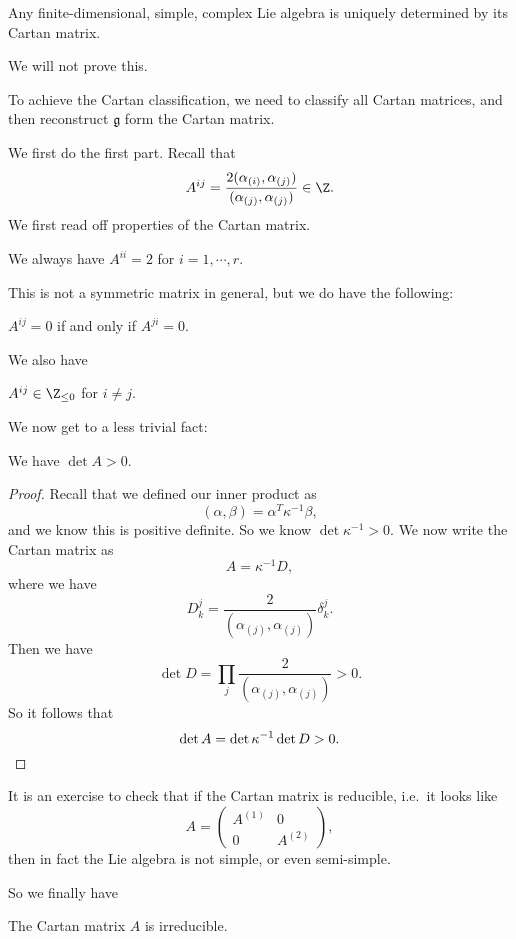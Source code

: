 \documentclass[a4paper]{article}
\begin{document}
\begin{thm}[Cartan]
  Any finite-dimensional, simple, complex Lie algebra is uniquely determined by its Cartan matrix.
\end{thm}

We will not prove this.

To achieve the Cartan classification, we need to classify all Cartan matrices, and then reconstruct $\mathfrak{g}$ form the Cartan matrix.

We first do the first part. Recall that
\[
  A^{ij} = \frac{2 (\alpha_{(i)}, \alpha_{(j)})}{(\alpha_{(j)}, \alpha_{(j)})} \in \Z.
\]
We first read off properties of the Cartan matrix.
\begin{prop}
  We always have $A^{ii} = 2$ for $i = 1, \cdots, r$.
\end{prop}

This is not a symmetric matrix in general, but we do have the following:
\begin{prop}
  $A^{ij} = 0$ if and only if $A^{ji} = 0$.
\end{prop}

We also have
\begin{prop}
  $A^{ij} \in \Z_{\leq 0}$ for $i \not= j$.
\end{prop}

We now get to a less trivial fact:
\begin{prop}
  We have $\det A > 0$.
\end{prop}

\begin{proof}
  Recall that we defined our inner product as
  \[
    (\alpha, \beta) = \alpha^T \kappa^{-1} \beta,
  \]
  and we know this is positive definite. So we know $\det \kappa^{-1} > 0$. We now write the Cartan matrix as
  \[
    A = \kappa^{-1}D,
  \]
  where we have
  \[
    D_k^j = \frac{2}{(\alpha_{(j)}, \alpha_{(j)})} \delta^j_k.
  \]
  Then we have
  \[
    \det D = \prod_j \frac{2}{(\alpha_{(j)}, \alpha_{(j)})} > 0.
  \]
  So it follows that
  \[
    \det A = \det \kappa^{-1} \det D > 0. \qedhere
  \]
\end{proof}

It is an exercise to check that if the Cartan matrix is reducible, i.e.\ it looks like
\[
  A =
  \begin{pmatrix}
    A^{(1)} & 0\\
    0 & A^{(2)}
  \end{pmatrix},
\]
then in fact the Lie algebra is not simple, or even semi-simple.

So we finally have
\begin{prop}
  The Cartan matrix $A$ is irreducible.
\end{prop}
\end{document}
